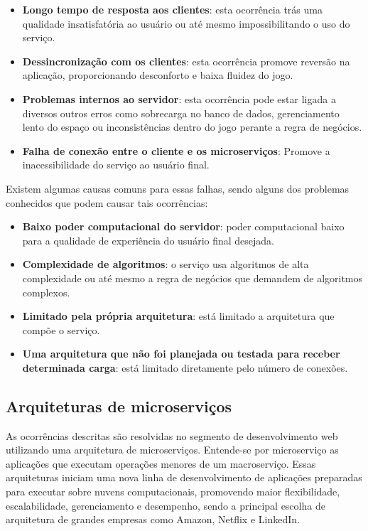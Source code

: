 \begin{itemize}
  \item \textbf{Longo tempo de resposta aos clientes}: esta ocorrência trás uma qualidade insatisfatória ao usuário ou até mesmo impossibilitando o uso do serviço.
  \item \textbf{Dessincronização com os clientes}: esta ocorrência promove reversão na aplicação, proporcionando desconforto e baixa fluidez do jogo.
  \item \textbf{Problemas internos ao servidor}: esta ocorrência pode estar ligada a diversos outros erros como sobrecarga no banco de dados, gerenciamento lento do espaço ou inconsistências dentro do jogo perante a regra de negócios.
  \item \textbf{Falha de conexão entre o cliente e os microserviços}: Promove a inacessibilidade do serviço ao usuário final.
\end{itemize}

Existem algumas causas comuns para essas falhas, sendo alguns dos problemas conhecidos que podem causar tais ocorrências\cite{1417630}:

\begin{itemize}
  \item \textbf{Baixo poder computacional do servidor}: poder computacional baixo para a qualidade de experiência do usuário final desejada.
  \item \textbf{Complexidade de algoritmos}: o serviço usa algoritmos de alta complexidade ou até mesmo a regra de negócios que demandem de algoritmos complexos.
  \item \textbf{Limitado pela própria arquitetura}: está limitado a arquitetura que compõe o serviço.
  \item \textbf{Uma arquitetura que não foi planejada ou testada para receber determinada carga}: está limitado diretamente pelo número de conexões.
\end{itemize}

\subsection{Arquiteturas de microserviços}

As ocorrências descritas são resolvidas no segmento de desenvolvimento web utilizando uma arquitetura de microserviços. Entende-se por microserviço as aplicações que executam operações menores de um macroserviço\cite{stephenclarkewillson2017}. Essas arquiteturas iniciam uma nova linha de desenvolvimento de aplicações preparadas para executar sobre nuvens computacionais, promovendo maior flexibilidade, escalabilidade, gerenciamento e desempenho, sendo a principal escolha de arquitetura de grandes empresas como Amazon, Netflix e LinkedIn\cite{7830692}\cite{7515686}.

